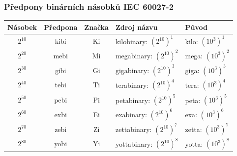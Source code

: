 	\begin{frame}
    \frametitle{Předpony binárních násobků IEC 60027-2}
		
		\begin{tabular}{ c  c  c  l  l }
				\hline
				\textbf{Násobek} & \textbf{Předpona} & \textbf{Značka} & \textbf{Zdroj názvu} & \textbf{Původ}\\
				\hline
				$2^{10}$ & kibi & Ki & kilobinary: $(2^{10})^{1}$ & kilo: $(10^{3})^{1}$ \\
        $2^{20}$ & mebi & Mi & megabinary: $(2^{10})^{2}$ & mega: $(10^{3})^{2}$ \\
        $2^{30}$ & gibi & Gi & gigabinary: $(2^{10})^{3}$ & giga: $(10^{3})^{3}$ \\
        $2^{40}$ & tebi & Ti & terabinary: $(2^{10})^{4}$ & tera: $(10^{3})^{4}$ \\
        $2^{50}$ & pebi & Pi & petabinary: $(2^{10})^{5}$ & peta: $(10^{3})^{5}$ \\
        $2^{60}$ & exbi & Ei & exabinary: $(2^{10})^{6}$ & exa: $(10^{3})^{6}$ \\
        $2^{70}$ & zebi & Zi & zettabinary: $(2^{10})^{7}$ & zetta: $(10^{3})^{7}$ \\
        $2^{80}$ & yobi & Yi & yottabinary: $(2^{10})^{8}$ & yotta: $(10^{3})^{8}$ \\
				\hline
			\end{tabular}
	\end{frame}